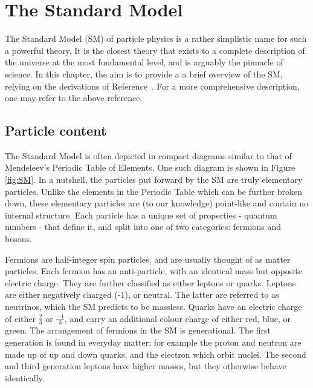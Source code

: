 
\chapter{The Standard Model}
\label{chap:theory}

The Standard Model (SM) of particle physics is a rather simplistic name for such a powerful theory. It is the closest theory that exists to a complete description of the universe at the most fundamental level, and is arguably the pinnacle of science. In this chapter, the aim is to provide a a brief overview of the SM, relying on the derivations of Reference~\cite{Griffiths:2008zz}. For a more comprehensive description, one may refer to the above reference.

\section{Particle content}

The Standard Model is often depicted in compact diagrams similar to that of Mendeleev's Periodic Table of Elements. One such diagram is shown in Figure \ref{fig:SM}. In a nutshell, the particles put forward by the SM are truly elementary particles. Unlike the elements in the Periodic Table which can be further broken down, these elementary particles are (to our knowledge) point-like and contain no internal structure. Each particle has a unique set of properties - quantum numbers - that define it, and split into one of two categories: fermions and bosons. 

Fermions are half-integer spin particles, and are usually thought of as matter particles. Each fermion has an anti-particle, with an identical mass but opposite electric charge. They are further classified as either leptons or quarks. Leptons are either negatively charged (-1), or neutral. The latter are referred to as neutrinos, which the SM predicts to be massless. Quarks have an electric charge of either $\frac{2}{3}$ or $\frac{-1}{3}$, and carry an additional colour charge of either red, blue, or green. The arrangement of fermions in the SM is generational. The first generation is found in everyday matter; for example the proton and neutron are made up of up and down quarks, and the electron which orbit nuclei. The second and third generation leptons have higher masses, but they otherwise behave identically. 

